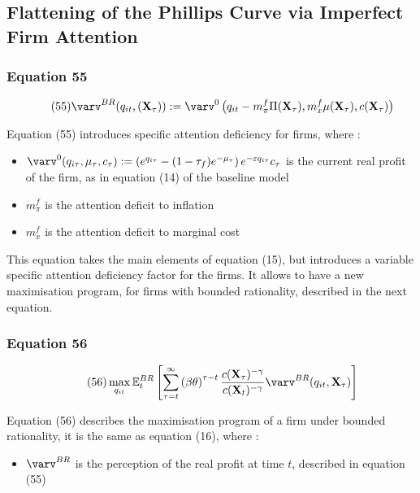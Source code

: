 \documentclass{article}
\begin{document}
\subsection{Flattening of the Phillips Curve via Imperfect Firm Attention}

\subsubsection*{Equation 55}

\begin{equation}\tag{55}
    \varv^{BR}(q_{it},(\textbf{X}_{\tau})):=\varv^{0}\left(q_{it}-m^{f}_{\pi}\Pi(\textbf{X}_{\tau}),m^{f}_{x}\mu(\textbf{X}_{\tau}),c(\textbf{X}_{\tau})\right)
\end{equation}

Equation (55) introduces specific attention deficiency for firms, where : 
\begin{itemize}
    \item $\varv^{0}(q_{i\tau},\mu_{\tau},c_{\tau}):=\left(e^{q_{i\tau}}-(1-\tau_{f})e^{-\mu_{\tau}}\right)e^{-\varepsilon q_{i\tau}}c_{\tau}$ is the current real profit of the firm, as in equation (14) of the baseline model
    \item $m^{f}_{\pi}$ is the attention deficit to inflation 
    \item $m^{f}_{x}$ is the attention deficit to marginal cost
\end{itemize}

This equation takes the main elements of equation (15), but introduces a variable specific attention deficiency factor for the firms. 
It allows to have a new maximisation program, for firms with bounded rationality, described in the next equation.

\subsubsection*{Equation 56}

\begin{equation}\tag{56}
    \max_{q_{it}}{\mathbb{E}_{t}^{BR}\left[\sum_{\tau=t}^{\infty}\left(\beta\theta\right)^{\tau-t}\frac{c(\textbf{X}_{\tau})^{-\gamma}}{c(\textbf{X}_{t})^{-\gamma}}\varv^{BR}(q_{it},\textbf{X}_{\tau})\right]}
\end{equation}

Equation (56) describes the maximisation program of a firm under bounded rationality, it is the same as equation (16), where : 
\begin{itemize}
    \item $\varv^{BR}$ is the perception of the real profit at time $t$, described in equation (55)
\end{itemize}
\end{document}

